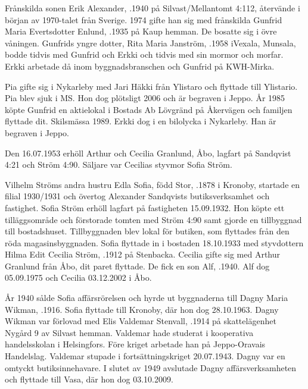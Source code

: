 Frånskilda sonen Erik Alexander, .1940 på Silvast/Mellantomt 4:112, återvände i början av 1970-talet från Sverige. 1974 gifte han sig med frånskilda Gunfrid Maria Evertsdotter Enlund, .1935 på Kaup hemman. De bosatte sig i övre våningen. Gunfrids yngre dotter, Rita Maria Janström, .1958 iVexala, Munsala, bodde tidvis med Gunfrid och Erkki och tidvis med sin mormor och morfar. Erkki arbetade då inom byggnadsbranschen och Gunfrid på KWH-Mirka.
\begin{jhchildren}
  \item {}
\end{jhchildren}
Pia gifte sig i Nykarleby med Jari Häkki från Ylistaro och flyttade till Ylistario. Pia blev sjuk i MS. Hon dog plötsligt 2006 och är begraven i Jeppo. År 1985 köpte Gunfrid en aktielokal i Bostads Ab Lövgränd på Åkervägen och familjen flyttade dit. Skilsmässa 1989. Erkki dog i en bilolycka i Nykarleby. Han är begraven i Jeppo.


Den 16.07.1953 erhöll Arthur och Cecilia Granlund, Åbo, lagfart	på Sandqvist 4:21 och Ström 4:90. Säljare var Cecilias styvmor Sofia Ström.


Vilhelm Ströms andra hustru Edla Sofia, född Stor, .1878 i Kronoby, startade en filial 1930/1931 och övertog Alexander Sandqvists butiksverksamhet och fastighet. Sofia Ström erhöll lagfart på fastigheten 15.09.1932. Hon köpte ett tilläggsområde och förstorade tomten med Ström 4:90 samt gjorde en tillbyggnad till bostadshuset. Tillbyggnaden blev lokal för butiken, som flyttades från den röda magasinsbyggnaden. Sofia flyttade in i bostaden 18.10.1933 med styvdottern Hilma Edit Cecilia Ström, .1912 på Stenbacka. Cecilia gifte sig med Arthur Granlund från Åbo, dit paret flyttade. De fick en son Alf, .1940. Alf dog 05.09.1975 och Cecilia 03.12.2002 i Åbo.

	År 1940 sålde Sofia affärsrörelsen och hyrde ut byggnaderna till Dagny Maria Wikman, .1916. Sofia flyttade till Kronoby, där hon dog 28.10.1963. Dagny Wikman var förlovad med Elis Valdemar Stenvall, .1914 på skattelägenhet Nygård 9 av Silvast hemman. Valdemar hade studerat i kooperativa handelsskolan i	Helsingfors. Före kriget arbetade han på Jeppo-Oravais Handelslag. Valdemar stupade i fortsättningskriget 20.07.1943. Dagny var en	omtyckt butiksinnehavare. I slutet av 1949 avslutade Dagny affärsverksamheten och flyttade till Vasa, där hon dog 03.10.2009.


